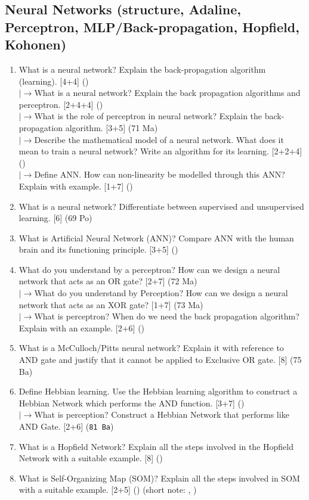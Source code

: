 \documentclass[12pt]{article}
\newcommand{\lb}{\\$\left|\rightarrow\right.$}
\begin{document}
  \subsection{Neural Networks (structure, Adaline, Perceptron, MLP/Back-propagation, Hopfield, Kohonen)}
    \begin{enumerate}[topsep=0pt, noitemsep]
      \item What is a neural network? Explain the back-propagation algorithm (learning). \hfill [4+4] ()
        \lb What is a neural network? Explain the back propagation algorithms and perceptron. \hfill [2+4+4] ()
        \lb What is the role of perceptron in neural network? Explain the back-propagation algorithm. \hfill [3+5] (71 Ma)
        \lb Describe the mathematical model of a neural network. What does it mean to train a neural network? Write an algorithm for its learning. \hfill [2+2+4] ()
        \lb Define ANN. How can non-linearity be modelled through this ANN? Explain with example. \hfill [1+7] ()

      \item What is a neural network? Differentiate between supervised and unsupervised learning. \hfill [6] (69 Po)

      \item What is Artificial Neural Network (ANN)? Compare ANN with the human brain and its functioning principle. \hfill [3+5] ()

      \item What do you understand by a perceptron? How can we design a neural network that acts as an OR gate? \hfill [2+7] (72 Ma)
        \lb What do you understand by Perception? How can we design a neural network that acts as an XOR gate? \hfill [1+7] (73 Ma)
        \lb What is perceptron? When do we need the back propagation algorithm? Explain with an example. \hfill [2+6] ()

      \item What is a McCulloch/Pitts neural network? Explain it with reference to AND gate and justify that it cannot be applied to Exclusive OR gate. \hfill [8] (75 Ba)

      \item Define Hebbian learning. Use the Hebbian learning algorithm to construct a Hebbian Network which performs the AND function. \hfill [3+7] ()
        \lb What is perception? Construct a Hebbian Network that performs like AND Gate. \hfill [2+6] (\texttt{81 Ba})

      \item What is a Hopfield Network? Explain all the steps involved in the Hopfield Network with a suitable example. \hfill [8] ()

      \item What is Self-Organizing Map (SOM)? Explain all the steps involved in SOM with a suitable example. \hfill [2+5] () \quad (short note: , )
    \end{enumerate}
\end{document}
